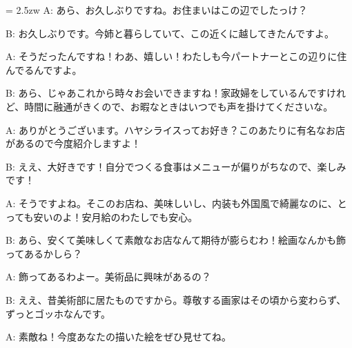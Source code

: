 \documentclass[11pt]{amsart}
\title{}
\author{}
\newenvironment{hangall}[1]{\hangindent = 2.5zw\everypar{\hangindent = 2.5zw}}{}
\begin{document}
\maketitle
\begin{hangall}{}%
A: あら、お久しぶりですね。お住まいはこの辺でしたっけ？

B: お久しぶりです。今姉と暮らしていて、この近くに越してきたんですよ。

A: そうだったんですね！わあ、嬉しい！わたしも今パートナーとこの辺りに住んでるんですよ。

B: あら、じゃあこれから時々お会いできますね！家政婦をしているんですけれど、時間に融通がきくので、お暇なときはいつでも声を掛けてくださいな。

A: ありがとうございます。ハヤシライスってお好き？このあたりに有名なお店があるので今度紹介しますよ！

B: ええ、大好きです！自分でつくる食事はメニューが偏りがちなので、楽しみです！

A: そうですよね。そこのお店ね、美味しいし、内装も外国風で綺麗なのに、とっても安いのよ！安月給のわたしでも安心。

B: あら、安くて美味しくて素敵なお店なんて期待が膨らむわ！絵画なんかも飾ってあるかしら？

A: 飾ってあるわよー。美術品に興味があるの？

B: ええ、昔美術部に居たものですから。尊敬する画家はその頃から変わらず、ずっとゴッホなんです。

A: 素敵ね！今度あなたの描いた絵をぜひ見せてね。
\end{hangall}
\end{document}
